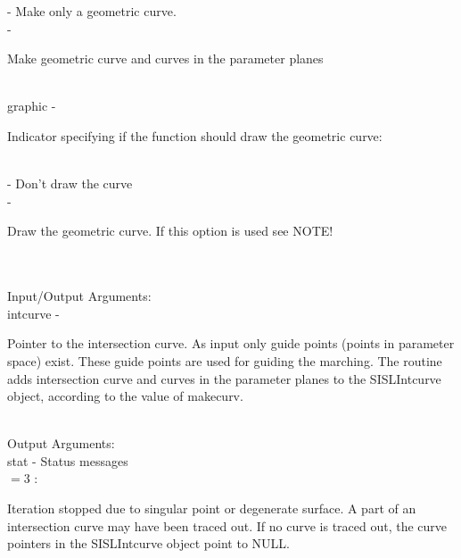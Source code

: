                 \>\>\>\> -     \>Make only a geometric curve.\\
                \>\>\>\> -     \>\begin{minipg5}
                                        Make geometric curve and curves in the parameter
                                        planes
                                        \end{minipg5} \\[0.3ex]
        \>\>    {\fov graphic}\> - \>   \begin{minipg2}
                                Indicator specifying if the function
                                should draw the geometric curve:
                                \end{minipg2}\\
                \>\>\>\> -     \>Don't draw the curve\\
                \>\>\>\> -     \>\begin{minipg5}
                                        Draw the geometric curve. If this option
                                        is used see NOTE!
                                        \end{minipg5} \\[0.8ex]
\\ %
        \>Input/Output Arguments:\\
        \>\>    {\fov intcurve}\> - \>  \begin{minipg2}
                                Pointer to the intersection curve.
                                As input only
                                guide points (points in parameter space)
                                exist. These guide points
                                are used for guiding the marching.
                                The routine adds
                                intersection curve and curves in the parameter
                                planes to the SISLIntcurve object, according to the value
                                of makecurv.
                                \end{minipg2}\\
\newpagetabs
        \>Output Arguments:\\
        \>\>    {\fov stat}     \> - \> Status messages\\
                \>\>\>\>\>              $= 3$ : \>      \begin{minipg5}
                                                        Iteration stopped due to singular
                                                        point or degenerate surface. A part of an
                                                        intersection curve may have been
                                                        traced out. If no curve is traced out,
                                                        the curve pointers in the SISLIntcurve
                                                        object point to NULL.
                                                        \end{minipg5} \\[0.3ex]
